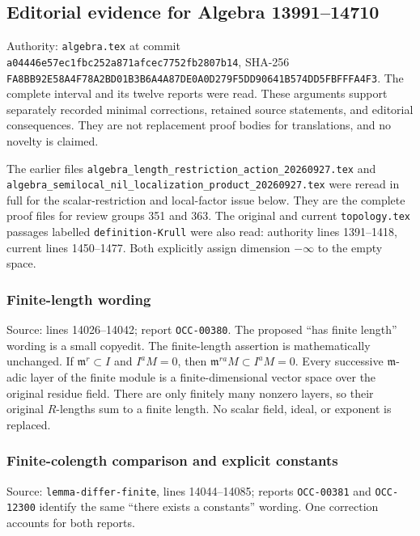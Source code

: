 \subsection{Editorial evidence for Algebra 13991--14710}\label{editorial-evidence-for-algebra-1399114710}

Authority: \texttt{algebra.tex} at commit \texttt{a04446e57ec1fbc252a871afcec7752fb2807b14}, SHA-256 \texttt{FA8BB92E58A4F78A2BD01B3B6A4A87DE0A0D279F5DD90641B574DD5FBFFFA4F3}. The complete interval and its twelve reports were read. These arguments support separately recorded minimal corrections, retained source statements, and editorial consequences. They are not replacement proof bodies for translations, and no novelty is claimed.

The earlier files \texttt{algebra\_length\_restriction\_action\_20260927.tex} and \texttt{algebra\_semilocal\_nil\_localization\_product\_20260927.tex} were reread in full for the scalar-restriction and local-factor issue below. They are the complete proof files for review groups 351 and 363. The original and current \texttt{topology.tex} passages labelled \texttt{definition-Krull} were also read: authority lines 1391--1418, current lines 1450--1477. Both explicitly assign dimension \(-\infty\) to the empty space.

\subsubsection{Finite-length wording}\label{finite-length-wording}

Source: lines 14026--14042; report \texttt{OCC-00380}. The proposed ``has finite length'' wording is a small copyedit. The finite-length assertion is mathematically unchanged. If \(\mathfrak m^r\subset I\) and \(I^aM=0\), then \(\mathfrak m^{ra}M\subset I^aM=0\). Every successive \(\mathfrak m\)-adic layer of the finite module is a finite-dimensional vector space over the original residue field. There are only finitely many nonzero layers, so their original \(R\)-lengths sum to a finite length. No scalar field, ideal, or exponent is replaced.

\subsubsection{Finite-colength comparison and explicit constants}\label{finite-colength-comparison-and-explicit-constants}

Source: \texttt{lemma-differ-finite}, lines 14044--14085; reports \texttt{OCC-00381} and \texttt{OCC-12300} identify the same ``there exists a constants'' wording. One correction accounts for both reports.

